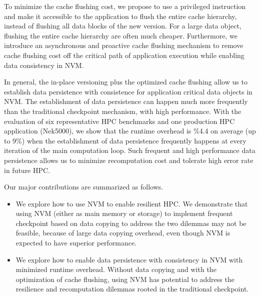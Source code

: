 To minimize the cache flushing cost, we propose to use a privileged instruction and make it accessible to the application to flush the entire cache hierarchy, instead of flushing all data blocks of the new version. For a large data object, flushing the entire cache hierarchy are often much cheaper.
Furthermore, we introduce an asynchronous and proactive cache flushing mechanism to 
remove cache flushing cost off the critical path of application execution
while enabling data consistency in NVM.

In general, the in-place versioning plus the optimized cache flushing allow us to establish data persistence with consistence for application critical data objects in NVM.  %
The establishment of data persistence can happen much more frequently 
than the traditional checkpoint mechanism, with high performance.
With the evaluation of six representative HPC benchmarks and one production HPC application (Nek5000), we show that the runtime overhead is \%4.4 on average (up to 9\%) when the establishment of data persistence frequently happens at every iteration of the main computation loop. 
Such frequent and high performance data persistence allows us to
minimize recomputation cost and tolerate high error rate
in future HPC.

Our major contributions are summarized as follows.
\vspace{-1pt}
\begin{itemize}
  
  \item We explore how to use NVM to enable resilient HPC. We demonstrate that using NVM (either as main memory or storage) to implement frequent checkpoint based on data copying to address the two dilemmas may not be feasible, because of large data copying overhead, even though NVM is expected to have superior performance.
  
  \item We explore how to enable data persistence with consistency in NVM with minimized runtime overhead. Without data copying and with the optimization of cache flushing, using NVM has potential to address the resilience and recomputation dilemmas rooted in the traditional checkpoint.
\end{itemize}



